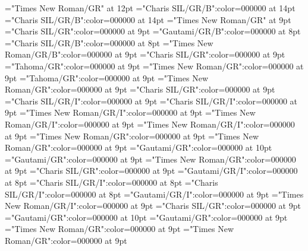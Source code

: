 \documentclass[gps1,twoside]{article}
\begin{document}
\font\xitemtpi="Times New Roman/GR" at 12pt
\font{}="Charis SIL/GR/B":color=000000 at 14pt
\font{}="Charis SIL/GR/B":color=000000 at 14pt
\font{}="Times New Roman/GR" at 9pt
\font\entryletDatadicBody="Charis SIL/GR":color=000000 at 9pt
\font\headwordggoTeluINentryletDatadicBody="Gautami/GR/B":color=000000 at 8pt
\font\headwordafterentryletDatadicBody="Charis SIL/GR/B":color=000000 at 8pt
\font\spanenheadwordggoTeluINentryletDatadicBody="Times New Roman/GR/B":color=000000 at 9pt
\font\spanentryletDatadicBody="Charis SIL/GR":color=000000 at 9pt
\font\pronunciationggofonipaxemicspanentryletDatadicBody="Tahoma/GR":color=000000 at 9pt
\font\spanenpronunciationggofonipaxemicspanentryletDatadicBody="Times New Roman/GR":color=000000 at 9pt
\font\spanggofonipaxemicpronunciationggofonipaxemicspanentryletDatadicBody="Tahoma/GR":color=000000 at 9pt
\font\spanenspanentryletDatadicBody="Times New Roman/GR":color=000000 at 9pt
\font\sensespanentryletDatadicBody="Charis SIL/GR":color=000000 at 9pt
\font\grammaticalinfosensespanentryletDatadicBody="Charis SIL/GR/I":color=000000 at 9pt
\font\grammaticalinfoaftersensespanentryletDatadicBody="Charis SIL/GR/I":color=000000 at 9pt
\font\partofspeechengrammaticalinfosensespanentryletDatadicBody="Times New Roman/GR/I":color=000000 at 9pt
\font\spanenpartofspeechengrammaticalinfosensespanentryletDatadicBody="Times New Roman/GR/I":color=000000 at 9pt
\font\spanengrammaticalinfosensespanentryletDatadicBody="Times New Roman/GR/I":color=000000 at 9pt
\font{}="Times New Roman/GR":color=000000 at 9pt
\font\spanendefinitionensensespanentryletDatadicBody="Times New Roman/GR":color=000000 at 9pt
\font\LexSensepublishStemGlossPubLdtesensespanentryletDatadicBody="Gautami/GR":color=000000 at 10pt
\font\spanteLexSensepublishStemGlossPubLdtesensespanentryletDatadicBody="Gautami/GR":color=000000 at 9pt
\font\spanenLexSensepublishStemGlossPubLdtesensespanentryletDatadicBody="Times New Roman/GR":color=000000 at 9pt
\font\spansensespanentryletDatadicBody="Charis SIL/GR":color=000000 at 9pt
\font\exampleggoTeluINspansensespanentryletDatadicBody="Gautami/GR/I":color=000000 at 8pt
\font\examplebeforespansensespanentryletDatadicBody="Charis SIL/GR/I":color=000000 at 8pt
\font\exampleafterspansensespanentryletDatadicBody="Charis SIL/GR/I":color=000000 at 8pt
\font\spanggoTeluINexampleggoTeluINspansensespanentryletDatadicBody="Gautami/GR/I":color=000000 at 9pt
\font\spanenexampleggoTeluINspansensespanentryletDatadicBody="Times New Roman/GR/I":color=000000 at 9pt
\font\spanspansensespanentryletDatadicBody="Charis SIL/GR":color=000000 at 9pt
\font\translationLdtespanspansensespanentryletDatadicBody="Gautami/GR":color=000000 at 10pt
\font\spantetranslationLdtespanspansensespanentryletDatadicBody="Gautami/GR":color=000000 at 9pt
\font\spanentranslationLdtespanspansensespanentryletDatadicBody="Times New Roman/GR":color=000000 at 9pt
\font\spanenspansensespanentryletDatadicBody="Times New Roman/GR":color=000000 at 9pt
\end{document}
